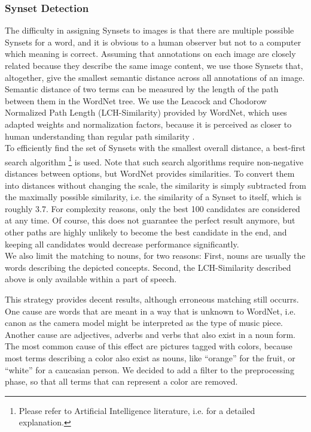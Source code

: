 \subsubsection{Synset Detection}
\label{sec_synsetdetection}
The difficulty in assigning Synsets to images is that there are multiple possible Synsets for a word, and it is obvious to a human observer but not to a computer which meaning is correct. Assuming that annotations on each image are closely related because they describe the same image content, we use those Synsets that, altogether, give the smallest semantic distance across all annotations of an image. Semantic distance of two terms can be measured by the length of the path between them in the WordNet tree. We use the Leacock and Chodorow Normalized Path Length (LCH-Similarity) provided by WordNet, which uses adapted weights and normalization factors, because it is perceived as closer to human understanding than regular path similarity \cite{budanitsky01}. \\

To efficiently find the set of Synsets with the smallest overall distance, a best-first search algorithm \footnote{Please refer to Artificial Intelligence literature, i.e. \cite{kumar2008} for a detailed explanation.} is used. Note that such search algorithms require non-negative distances between options, but WordNet provides similarities. To convert them into distances without changing the scale, the similarity is simply subtracted from the maximally possible similarity, i.e. the similarity of a Synset to itself, which is roughly 3.7.
For complexity reasons, only the best 100 candidates are considered at any time. Of course, this does not guarantee the perfect result anymore, but other paths are highly unlikely to become the best candidate in the end, and keeping all candidates would decrease performance significantly. \\
We also limit the matching to nouns, for two reasons: First, nouns are usually the words describing the depicted concepts. Second, the LCH-Similarity described above is only available within a part of speech. 

This strategy provides decent results, although erroneous matching still occurrs. One cause are words that are meant in a way that is unknown to WordNet, i.e. canon as the camera model might be interpreted as the type of music piece. Another cause are adjectives, adverbs and verbs that also exist in a noun form. The most common cause of this effect are pictures tagged with colors, because most terms describing a color also exist as nouns, like ``orange'' for the fruit, or ``white'' for a caucasian person. We decided to add a filter to the preprocessing phase, so that all terms that can represent a color are removed. \\

